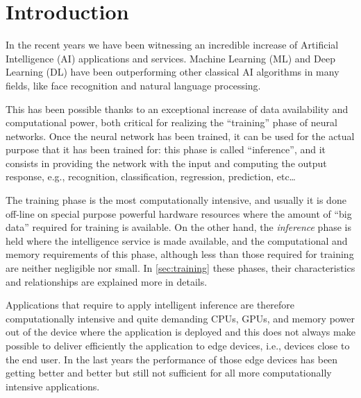 \chapter{Introduction}\label{ch:introduction}
In the recent years we have been witnessing an incredible increase of
Artificial Intelligence (AI) applications and services.
Machine Learning (ML) and Deep Learning (DL) have been outperforming other
classical AI algorithms in many fields, like face recognition and natural
language processing.

This has been possible thanks to an exceptional increase of data availability
and computational power, both critical for realizing the ``training'' phase of
neural networks.
Once the neural network has been trained, it can be used for the actual purpose
that it has been trained for: this phase is called ``inference'', and it
consists in providing the network with the input and computing the output
response, e.g., recognition, classification, regression, prediction,
etc\ldots

The training phase is the most computationally intensive, and usually it is
done off-line on special purpose powerful hardware resources where the amount
of ``big data'' required for training is available. On the other hand, the
\textit{inference} phase is held where the intelligence service is made
available, and the computational and memory requirements of this phase,
although less than those required for training are neither negligible nor
small.
In \autoref{sec:training} these phases, their characteristics and relationships
are explained more in details.

Applications that require to apply intelligent inference are therefore
computationally intensive and quite demanding CPUs, GPUs, and memory power out
of the device where the application is deployed and this does not always make
possible to deliver efficiently the application to edge devices, i.e., devices
close to the end user.
In the last years the performance of those edge devices has been getting better
and better but still not sufficient for all more computationally intensive
applications.

